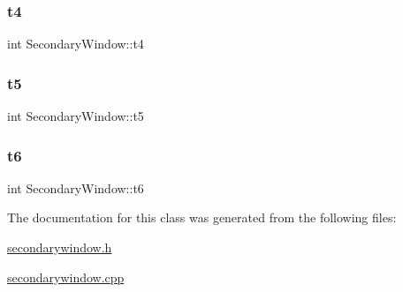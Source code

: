 \subsubsection{\texorpdfstring{t4}{t4}}
{\footnotesize\ttfamily int Secondary\+Window\+::t4}

\mbox{\label{class_secondary_window_add1e599530a5b8502fb502f090e67d3f}} 
\subsubsection{\texorpdfstring{t5}{t5}}
{\footnotesize\ttfamily int Secondary\+Window\+::t5}

\mbox{\label{class_secondary_window_a35d7a84fec48761c11414615c27b20ba}} 
\subsubsection{\texorpdfstring{t6}{t6}}
{\footnotesize\ttfamily int Secondary\+Window\+::t6}



The documentation for this class was generated from the following files\+:\begin{DoxyCompactItemize}
\item 
\mbox{\hyperlink{secondarywindow_8h}{secondarywindow.\+h}}\item 
\mbox{\hyperlink{secondarywindow_8cpp}{secondarywindow.\+cpp}}\end{DoxyCompactItemize}
